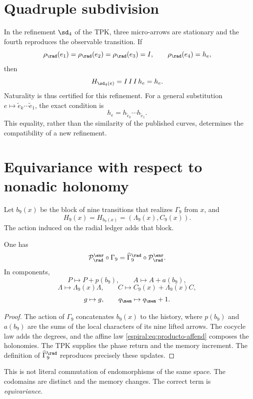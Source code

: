 \section{Quadruple subdivision}

In the refinement \(\sd_4\) of the TPK, three micro-arrows are stationary and the
fourth reproduces the observable transition. If
\[
 \rho_{\rad}(e_1)=\rho_{\rad}(e_2)=\rho_{\rad}(e_3)=I,
 \qquad \rho_{\rad}(e_4)=h_e,
\]
then
\[
 H_{\sd_4(e)}=I\,I\,I\,h_e=h_e.
\]
Naturality is thus certified for this refinement. For a general substitution \(e\mapsto\widetilde e_k\cdots\widetilde e_1\), the exact condition is
\[
 h_e=h_{\widetilde e_k}\cdots h_{\widetilde e_1}.
\]
This equality, rather than the similarity of the published curves, determines the
compatibility of a new refinement.

\section{Equivariance with respect to nonadic holonomy}

Let \(b_9(x)\) be the block of nine transitions that realizes \(\Gamma_9\) from
\(x\), and
\[
 H_9(x)=H_{b_9(x)}=(\Lambda_9(x),C_9(x)).
\]
The action induced on the radial ledger adds that block.

\begin{theorem}
One has
\begin{equation}
 \mathcal P_{\rad}^{\enr}\circ\Gamma_9
 =\widehat\Gamma_9^{\rad}\circ
 \mathcal P_{\rad}^{\enr}.
 \label{espiral:eq:equivarianza-gamma9}
\end{equation}
In components,
\[
 P\mapsto P+p(b_9),
 \qquad
 A\mapsto A+a(b_9),
\]
\[
 \Lambda\mapsto\Lambda_9(x)\Lambda,
 \qquad
 C\mapsto C_9(x)+\Lambda_9(x)C,
\]
\[
 g\mapsto g,\qquad q_{\mem}\mapsto q_{\mem}+1.
\]
\end{theorem}
\begin{proof}
The action of \(\Gamma_9\) concatenates \(b_9(x)\) to the history, where
\(p(b_9)\) and \(a(b_9)\) are the sums of the local characters of its nine
lifted arrows. The cocycle law adds the degrees, and the affine law
\cref{espiral:eq:producto-affend} composes the holonomies. The TPK supplies the phase
return and the memory increment. The definition of
\(\widehat\Gamma_9^{\rad}\) reproduces precisely these updates.
\end{proof}

This is not literal commutation of endomorphisms of the same space. The
codomains are distinct and the memory changes. The correct term is
\emph{equivariance}.

